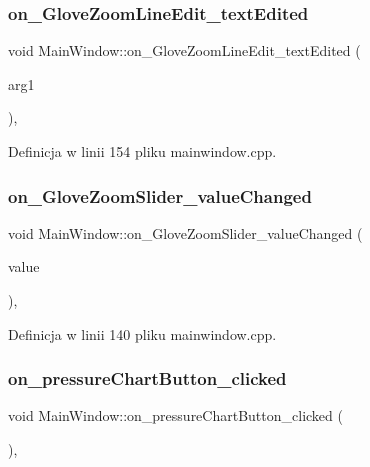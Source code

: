 \subsubsection{\texorpdfstring{on\+\_\+\+Glove\+Zoom\+Line\+Edit\+\_\+text\+Edited}{on\_GloveZoomLineEdit\_textEdited}}
{\footnotesize\ttfamily void Main\+Window\+::on\+\_\+\+Glove\+Zoom\+Line\+Edit\+\_\+text\+Edited (\begin{DoxyParamCaption}\item[{const Q\+String \&}]{arg1 }\end{DoxyParamCaption})\hspace{0.3cm}{\ttfamily [private]}, {\ttfamily [slot]}}



Definicja w linii 154 pliku mainwindow.\+cpp.

\mbox{\label{class_main_window_a1d8082f8507bb23824db76cca6a047a3}} 
\subsubsection{\texorpdfstring{on\+\_\+\+Glove\+Zoom\+Slider\+\_\+value\+Changed}{on\_GloveZoomSlider\_valueChanged}}
{\footnotesize\ttfamily void Main\+Window\+::on\+\_\+\+Glove\+Zoom\+Slider\+\_\+value\+Changed (\begin{DoxyParamCaption}\item[{int}]{value }\end{DoxyParamCaption})\hspace{0.3cm}{\ttfamily [private]}, {\ttfamily [slot]}}



Definicja w linii 140 pliku mainwindow.\+cpp.

\mbox{\label{class_main_window_a42c538f11724c7a0e0d86ef357199009}} 
\subsubsection{\texorpdfstring{on\+\_\+pressure\+Chart\+Button\+\_\+clicked}{on\_pressureChartButton\_clicked}}
{\footnotesize\ttfamily void Main\+Window\+::on\+\_\+pressure\+Chart\+Button\+\_\+clicked (\begin{DoxyParamCaption}{ }\end{DoxyParamCaption})\hspace{0.3cm}{\ttfamily [private]}, {\ttfamily [slot]}}



